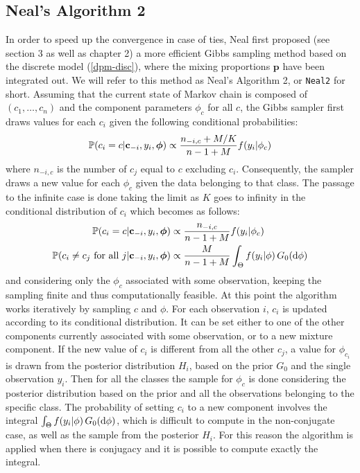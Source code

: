 \subsection{Neal's Algorithm 2} \label{neal2}
In order to speed up the convergence in case of ties, Neal first proposed (see \cite{neal} section 3 as well as \cite{book} chapter 2) a more efficient Gibbs sampling method based on the discrete model (\ref{dpm-disc}), where the mixing proportions $\textbf{p}$ have been integrated out.
We will refer to this method as Neal's Algorithm 2, or \verb|Neal2| for short.
Assuming that the current state of Markov chain is composed of $(c_1,\dots,c_n)$  and the component parameters $\phi_c$ for all $c$, the Gibbs sampler first draws values for each $c_i$ given the following conditional probabilities:
\begin{align}
	\mathbb P(c_{i}=c | \mathbf c_{-i}, y_{i},\boldsymbol\phi) \propto \frac{n_{-i,c} + M/{K}}{n-1+M} f(y_{i}|\phi_{c}) 
\end{align}
where $n_{-i,c}$ is the number of $c_j$ equal to $c$ excluding $c_i$.
Consequently, the sampler draws a new value for each $\phi_c$ given the data belonging to that class.
The passage to the infinite case is done taking the limit as $K$ goes to infinity in the conditional distribution of $c_i$ which becomes as follows:
\begin{equation}
	\begin{aligned} \label{probasneal2}
	\mathbb P(c_{i}=c | \mathbf c_{-i}, y_{i},\boldsymbol\phi) &\propto \frac{n_{-i,c} }{n-1+M} f(y_{i}|\phi_{c}) \\
	\mathbb P(c_{i}\neq c_{j} \text{ for all } j | \mathbf c_{-i}, y_{i},\boldsymbol\phi) &\propto \frac{M }{n-1+M} \int_{\Theta} f(y_{i}|\phi) \, G_0(\mathrm d\phi) 
	\end{aligned}
\end{equation}
and considering only the $\phi_c$ associated with some observation, keeping the sampling finite and thus computationally feasible.
At this point the algorithm works iteratively by sampling $c$ and $\phi$.
For each observation $i$, $c_i$ is updated according to its conditional distribution.
It can be set either to one of the other components currently associated with some observation, or to a new mixture component.
If the new value of $c_i$ is different from all the other $c_j$, a value for $\phi_{c_i}$ is drawn from the posterior distribution $H_i$, based on the prior $G_0$ and the single observation $y_i$.
Then for all the classes the  sample for $\phi_c$ is done considering the posterior distribution based on the prior and all the observations belonging to the specific class.
The probability of setting $c_i$ to a new component involves the integral $\int_{\Theta} f(y_{i}|\phi) \, G_0(\mathrm d\phi)$, which is difficult to compute in the non-conjugate case, as well as the sample from the posterior $H_i$. For this reason the algorithm is applied when there is conjugacy and it is possible to compute exactly the integral.

